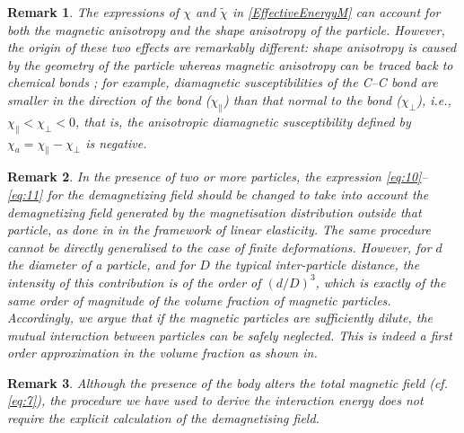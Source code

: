 \documentclass[oneside]{article}
\newtheorem{remark}{Remark}
\begin{document}
\begin{remark}{\rm 
		The expressions of $\chi$ and $\tilde{\chi}$ in \eqref{EffectiveEnergyM} can account for both the magnetic anisotropy and the shape anisotropy of the particle.  However, the origin of these two effects are remarkably different: shape anisotropy is caused by the geometry of the particle whereas magnetic anisotropy can be traced back to chemical bonds \cite{Kimura2003,Abbott2007}; for example, diamagnetic susceptibilities of the C--C bond are smaller in the direction of the bond ($\chi_\parallel$) than that normal to the bond ($\chi_\perp$), \textit{i.e.}, $\chi_\parallel<\chi_\perp<0$, that is, the anisotropic diamagnetic susceptibility defined by $\chi_a = \chi_\parallel-\chi_\perp$ is negative.
		
	}\end{remark}
	\begin{remark}{\rm  
			In the presence of two or more particles, the expression \eqref{eq:10}--\eqref{eq:11}  for the demagnetizing field should be changed to take into account the demagnetizing field generated by the magnetisation distribution outside that particle, as done in \cite{Borcea2001} in the framework of linear elasticity. The same procedure cannot be directly generalised to the case of finite deformations. However, for $d$ the diameter of a particle, and for $D$ the typical inter-particle distance, the intensity of this contribution is of the order of $(d/D)^3$, which is exactly of the same order of magnitude of  the volume fraction of magnetic particles. Accordingly, we argue that if the magnetic particles are sufficiently dilute, the mutual interaction between particles can be safely  neglected. This is indeed a first order approximation in the volume fraction as shown in\cite{Borcea2001}.
		}\end{remark}
		\begin{remark}{\rm  
				Although the presence of the body alters the total magnetic field (\emph{cf.} \eqref{eq:7}), the procedure we have used to derive the interaction energy does not require the explicit calculation of the demagnetising field.
			}\end{remark}
			
			
\end{document}
